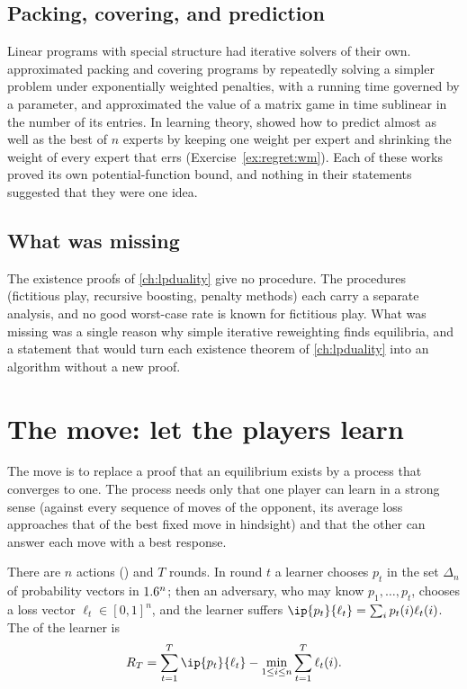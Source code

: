 \begin{refsection}
\subsection{Packing, covering, and prediction}

Linear programs with special structure had iterative solvers of their own. \textcite{PlotkinShmoysTardos1995} approximated packing and covering programs by repeatedly solving a simpler problem under exponentially weighted penalties, with a running time governed by a  parameter, and \textcite{GrigoriadisKhachiyan1995} approximated the value of a matrix game in time sublinear in the number of its entries. In learning theory, \textcite{LittlestoneWarmuth1994} showed how to predict almost as well as the best of $n$ experts by keeping one weight per expert and shrinking the weight of every expert that errs (Exercise~\ref{ex:regret:wm}). Each of these works proved its own potential-function bound, and nothing in their statements suggested that they were one idea.

\subsection{What was missing}

The existence proofs of \cref{ch:lpduality} give no procedure. The procedures (fictitious play, recursive boosting, penalty methods) each carry a separate analysis, and no good worst-case rate is known for fictitious play. What was missing was a single reason why simple iterative reweighting finds equilibria, and a statement that would turn each existence theorem of \cref{ch:lpduality} into an algorithm without a new proof.

\section{The move: let the players learn}\label{sec:regret:move}

The move is to replace a proof that an equilibrium exists by a process that converges to one. The process needs only that one player can learn in a strong sense (against every sequence of moves of the opponent, its average loss approaches that of the best fixed move in hindsight) and that the other can answer each move with a best response.

\begin{definition}\label{def:regret:experts}
There are $n$ actions () and $T$ rounds. In round $t$ a learner chooses $p_t$ in the set $\Delta_n$ of probability vectors in $1.6^n$; then an adversary, who may know $p_1,\dots,p_t$, chooses a loss vector $\ell_t\in[0,1]^n$, and the learner suffers $\ip{p_t}{\ell_t}=\sum_ip_t(i)\ell_t(i)$. The  of the learner is
\[
R_T=\sum_{t=1}^T\ip{p_t}{\ell_t}-\min_{1\le i\le n}\sum_{t=1}^T\ell_t(i).
\]
\end{definition}


\end{refsection}
